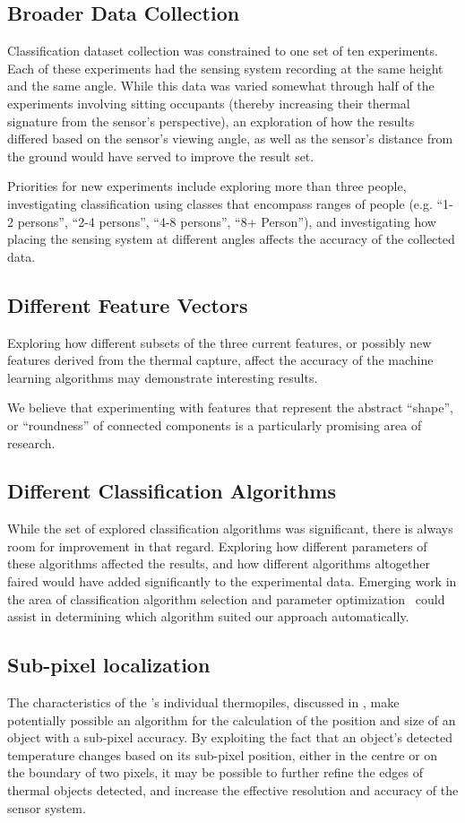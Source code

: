 \documentclass[../thesis/thesis.tex]{subfiles}
\begin{document}
\subsection{Broader Data Collection}
Classification dataset collection was constrained to one set of ten experiments. Each of these experiments had the sensing system recording at the same height and the same angle. While this data was varied somewhat through half of the experiments involving sitting occupants (thereby increasing their thermal signature from the sensor's perspective), an exploration of how the results differed based on the sensor's viewing angle, as well as the sensor's distance from the ground would have served to improve the result set.

Priorities for new experiments include exploring more than three people, investigating classification using classes that encompass ranges of people (e.g. ``1-2 persons'', ``2-4 persons'', ``4-8 persons'', ``8+ Person''), and investigating how placing the sensing system at different angles affects the accuracy of the collected data.

\subsection{Different Feature Vectors}
Exploring how different subsets of the three current features, or possibly new features derived from the thermal capture, affect the accuracy of the machine learning algorithms may demonstrate interesting results.

We believe that experimenting with features that represent the abstract ``shape'', or ``roundness'' of connected components is a particularly promising area of research.

\subsection{Different Classification Algorithms}
While the set of explored classification algorithms was significant, there is always room for improvement in that regard. Exploring how different parameters of these algorithms affected the results, and how different algorithms altogether faired would have added significantly to the experimental data. Emerging work in the area of classification algorithm selection and parameter optimization~\cite{thornton2013auto} could assist in determining which algorithm suited our approach automatically.

\subsection{Sub-pixel localization}
The  characteristics of the \mlx's individual thermopiles, discussed in , make potentially possible an algorithm for the calculation of the position and size of an object with a sub-pixel accuracy. By exploiting the fact that an object's detected temperature changes based on its sub-pixel position, either in the centre or on the boundary of two pixels, it may be possible to further refine the edges of thermal objects detected, and increase the effective resolution and accuracy of the sensor system.
\end{document}

